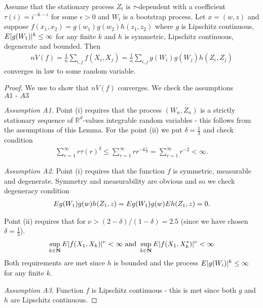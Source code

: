 \begin{lemma}
\label{lem:convergence2012}
Assume that the stationary process $Z_t$ is $\tau$-dependent with a coefficient $\tau(i) = i^{-6-\epsilon}$ for some $\epsilon>0$ and $W_i$ is a bootstrap process. Let $x=(w,z)$ and suppose $f(x_1,x_2) = g(w_1)g(w_2) h(z_1,z_2)$ where $g$ is Lipschitz continuous, $E |g(W_1)|^k \leq \infty$ for any finite $k$ and $h$ is symmetric, Lipschitz continuous, degenerate and bounded. Then 
\begin{align}
n V(f)= \frac 1 n \sum_{i,j} f(X_i,X_j) = \frac 1 n \sum_{i,j} g(W_i) g(W_j) h(Z_i,Z_j) 
\end{align}
converges in law to some random variable.   
\end{lemma}
\begin{proof}
We use  \cite[Theorem 2.1]{leucht2012degenerate} to show that $n V(f)$ converges. We check the assumptions $\textit{A1 - A3}$ 

\textit{Assumption A1.} Point (i) requires that the process $(W_n,Z_n)$ is a strictly stationary sequence of $\mathbb{R}^d$-values integrable random variables - this follows from the assumptions of this Lemma. For the point (ii) we put $\delta=\frac 1 3$ and check condition
\begin{align}
\sum_{r=1}^{\infty} r \tau(r)^{\delta} \leq \sum_{r=1}^{\infty} r r^{-6 \frac 1 3} = \sum_{r=1}^{\infty} r^{-2} < \infty. 
\end{align}

\textit{Assumption A2.} Point (i) requires that the function $f$ is symmetric, measurable and
degenerate. Symmetry and measurability are obvious and so we check degeneracy condition
\begin{align}
E g(W_1) g(w) h(Z_1,z) =  E g(W_1) g(w) E h(Z_1,z) = 0.
\end{align}  

 Point (ii) requires that for $\nu > (2-\delta)/(1-\delta) = 2.5$ (since we have chosen $\delta=\frac 1 3$).
\begin{align}
\sup_{k \in \mathbf{N}} E |f(X_1,X_k)|^{\nu} < \infty \text{ and } \sup_{k \in \mathbf{N}} E |f(X_1,X_k^*)|^{\nu} < \infty
\end{align}
Both requirements are met since $h$ is bounded and the process $E |g(W_i)|^k \leq \infty$ for any finite $k$.

\textit{Assumption A3.} Function $f$ is Lipschitz continuous - this is met since both $g$ and $h$ are Lipschitz continuous.   
\end{proof}



